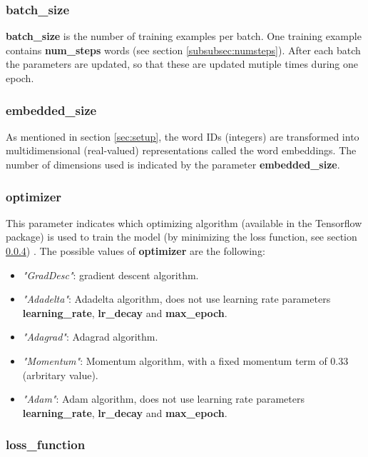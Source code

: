 \documentclass[10pt,a4paper,titlepage]{article}
\begin{document}
\subsubsection{batch\_size}

\textbf{batch\_size} is the number of training examples per batch. One training example contains \textbf{num\_steps} words (see section \ref{subsubsec:numsteps}). After each batch the parameters are updated, so that these are updated mutiple times during one epoch.

\subsubsection{embedded\_size}

As mentioned in section \ref{sec:setup}, the word IDs (integers) are transformed into multidimensional (real-valued) representations called the word embeddings. The number of dimensions used is indicated by the parameter \textbf{embedded\_size}.

\subsubsection{optimizer}
\label{subsubsec:opt}

This parameter indicates which optimizing algorithm (available in the Tensorflow package) is used to train the model (by minimizing the loss function, see section \ref{subsubsec:loss}) \cite{opt}. The possible values of \textbf{optimizer} are the following:

\begin{itemize}

	\item \textit{"GradDesc"}: gradient descent algorithm.
	\item \textit{"Adadelta"}: Adadelta algorithm, does not use learning rate parameters \textbf{learning\_rate}, \textbf{lr\_decay} and \textbf{max\_epoch}.
	\item \textit{"Adagrad"}: Adagrad algorithm.
	\item \textit{"Momentum"}: Momentum algorithm, with a fixed momentum term of 0.33 (arbritary value).
	\item \textit{"Adam"}: Adam algorithm, does not use learning rate parameters \textbf{learning\_rate}, \textbf{lr\_decay} and \textbf{max\_epoch}.	

\end{itemize}

\subsubsection{loss\_function}
\label{subsubsec:loss}
\end{document}
